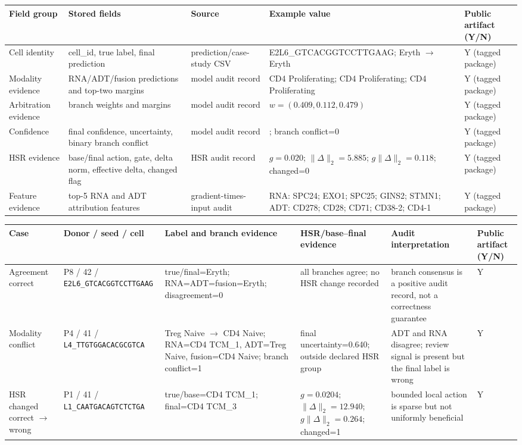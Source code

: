 \begin{tabular}{@{}>{\raggedright\arraybackslash}p{}>{\raggedright\arraybackslash}p{}>{\raggedright\arraybackslash}p{}>{\raggedright\arraybackslash}p{}>{\raggedright\arraybackslash}p{}@{}}
\toprule
Field group & Stored fields & Source & Example value & Public artifact (Y/N) \\
\midrule
Cell identity & cell\_id, true label, final prediction & prediction/case-study CSV & E2L6\_GTCACGGTCCTTGAAG; Eryth $\to$ Eryth & Y (tagged package) \\
Modality evidence & RNA/ADT/fusion predictions and top-two margins & model audit record & CD4 Proliferating; CD4 Proliferating; CD4 Proliferating & Y (tagged package) \\
Arbitration evidence & branch weights and margins & model audit record & $w=(0.409, 0.112, 0.479)$ & Y (tagged package) \\
Confidence & final confidence, uncertainty, binary branch conflict & model audit record & 0.854; branch conflict=0 & Y (tagged package) \\
HSR evidence & base/final action, gate, delta norm, effective delta, changed flag & HSR audit record & $g=0.020$; $\|\Delta\|_2=5.885$; $g\|\Delta\|_2=0.118$; changed=0 & Y (tagged package) \\
Feature evidence & top-5 RNA and ADT attribution features & gradient-times-input audit & RNA: SPC24; EXO1; SPC25; GINS2; STMN1; ADT: CD278; CD28; CD71; CD38-2; CD4-1 & Y (tagged package) \\
\bottomrule
\end{tabular}

\vspace{0.35em}
\begin{tabular}{@{}>{\raggedright\arraybackslash}p{}>{\raggedright\arraybackslash}p{}>{\raggedright\arraybackslash}p{}>{\raggedright\arraybackslash}p{}>{\raggedright\arraybackslash}p{}>{\raggedright\arraybackslash}p{}@{}}
\toprule
Case & Donor / seed / cell & Label and branch evidence & HSR/base--final evidence & Audit interpretation & Public artifact (Y/N) \\
\midrule
Agreement correct & P8 / 42 / \texttt{E2L6\_GTCACGGTCCTTGAAG} & true/final=Eryth; RNA=ADT=fusion=Eryth; disagreement=0 & all branches agree; no HSR change recorded & branch consensus is a positive audit record, not a correctness guarantee & Y \\
Modality conflict & P4 / 41 / \texttt{L4\_TTGTGGACACGCGTCA} & Treg Naive $\rightarrow$ CD4 Naive; RNA=CD4 TCM\_1, ADT=Treg Naive, fusion=CD4 Naive; branch conflict=1 & final uncertainty=0.640; outside declared HSR group & ADT and RNA disagree; review signal is present but the final label is wrong & Y \\
HSR changed correct $\rightarrow$ wrong & P1 / 41 / \texttt{L1\_CAATGACAGTCTCTGA} & true/base=CD4 TCM\_1; final=CD4 TCM\_3 & $g=0.0204$; $\|\Delta\|_2=12.940$; $g\|\Delta\|_2=0.264$; changed=1 & bounded local action is sparse but not uniformly beneficial & Y \\
\bottomrule
\end{tabular}
